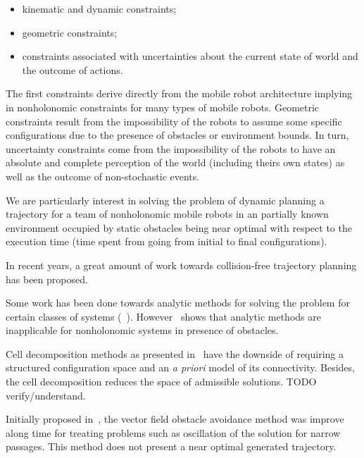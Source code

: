 \documentclass[eprint]{actapoly}
\begin{document}
\begin{itemize}

 \item kinematic and dynamic constraints;

 \item geometric constraints;

 \item constraints associated with uncertainties about the current state of 
world and the outcome of actions.

\end{itemize}

The first constraints derive directly from the mobile robot architecture 
implying in nonholonomic constraints for many types of mobile robots. Geometric 
constraints result from the impossibility of the robots to assume some specific 
configurations due to the presence of obstacles or environment bounds. In turn, 
uncertainty constraints come from the impossibility of the robots to have an 
absolute and complete perception of the world (including theirs own states) as 
well as the outcome of non-stochastic events.

 

We are particularly interest in solving the problem of dynamic planning a 
trajectory for a team of nonholonomic mobile robots in an partially known 
environment occupied by static obstacles being near optimal with respect to the 
execution time (time spent from going from initial to final configurations).

 


In recent years, a great amount of work towards collision-free trajectory 
planning has been proposed.

 

Some work has been done towards analytic methods for solving the problem for 
certain classes of systems (~\cite{}). However~\cite{schwartz1988survey} shows 
that analytic methods  are inapplicable for nonholonomic systems in presence of 
obstacles.

 

Cell decomposition methods as presented in~\cite{latombe2012robot} have the 
downside of requiring a structured configuration space and an \textit{a priori} 
model of its connectivity. Besides, the cell decomposition reduces the space 
of admissible solutions. TODO verify/understand.

 

Initially proposed in~\cite{Khatib1986}, the vector field obstacle avoidance 
method was improve along time for treating problems such as oscillation of the 
solution for narrow passages. This method does not present a near optimal 
generated trajectory.
\end{document}
